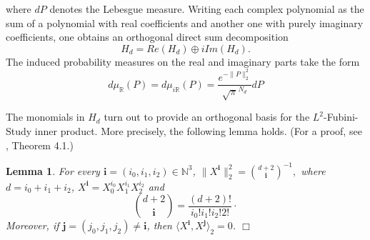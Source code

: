 \documentclass [11pt]{amsart}
\newtheorem {lemma}[theorem]{Lemma}
\theoremstyle{remark}
\numberwithin{equation}{section}
\numberwithin{theorem}{section}
\begin{document}
\noindent where $dP$ denotes the Lebesgue measure. Writing each complex polynomial as the sum of a polynomial with real coefficients and another one with purely imaginary coefficients, one obtains an orthogonal direct sum decomposition 
\begin{equation}\label{realim}
H_{d}=Re(H_{d})\oplus iIm(H_{d}).
\end{equation}
The induced probability measures on the real and imaginary parts take the form 
\begin{equation}\label{realKostlan}
d\mu_{\mathbb{R}}(P)=d\mu_{i\mathbb{R}}(P)=\frac{e^{-\|P\|^2_{2}}}{\sqrt{\pi}^{N_d}}dP 
\end{equation} 

The monomials in $H_{d}$ turn out to provide an orthogonal basis for the $L^2$-Fubini-Study inner product. More precisely, the following lemma holds. (For a proof, see \cite{Kos}, Theorem 4.1.)
\begin{lemma} \label{L2norms} 
For every $\mathbf{i}=(i_{0},i_{1},i_{2})\in \mathbb{N}^{3}$,
$\displaystyle{ \|X^{\mathbf{i}}\|_{2}^2 = {d+2 \choose \mathbf{i}}^{-1}, }$
where $d=i_{0}+i_{1}+i_{2}$, $X^{\mathbf{i}}=X_{0}^{i_{0}}X_{1}^{i_{1}}X_{2}^{i_{2}}$ and 
\[ {d+2 \choose \mathbf{i}}= \frac{(d+2)!}{i_{0}!i_{1}! i_{2}! 2! }\cdot\]
Moreover, if $\mathbf{j}=(j_{0},j_{1}, j_{2})\neq \mathbf{i}$, then $\langle X^{\mathbf{i}},X^{\mathbf{j}}\rangle_{2}=0$.  \hfill $\Box$ 
\end{lemma}
\end{document}
